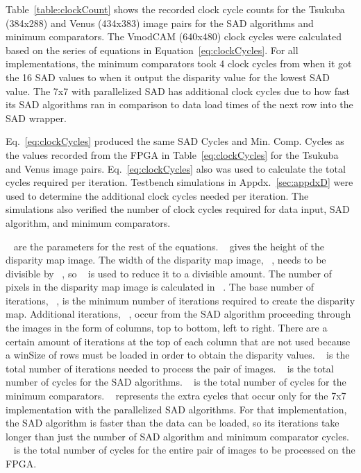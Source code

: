 Table~\ref{table:clockCount} shows the recorded clock cycle counts for the Tsukuba (384x288) and Venus (434x383) image pairs for the SAD algorithms and minimum comparators. The VmodCAM (640x480) clock cycles were calculated based on the series of equations in Equation~\ref{eq:clockCycles}. For all implementations, the minimum comparators took 4 clock cycles from when it got the 16 SAD values to when it output the disparity value for the lowest SAD value. The 7x7 with parallelized SAD has additional clock cycles due to how fast its SAD algorithms ran in comparison to data load times of the next row into the SAD wrapper.

Eq.~\ref{eq:clockCycles} produced the same SAD Cycles and Min. Comp. Cycles as the values recorded from the FPGA in Table~\ref{eq:clockCycles} for the Tsukuba and Venus image pairs. Eq.~\ref{eq:clockCycles} also was used to calculate the total cycles required per iteration. Testbench simulations in Appdx.~\ref{sec:appdxD} were used to determine the additional clock cycles needed per iteration. The simulations also verified the number of clock cycles required for data input, SAD algorithm, and minimum comparators.

~ are the parameters for the rest of the equations. ~ gives the height of the disparity map image. The width of the disparity map image, ~, needs to be divisible by ~, so ~ is used to reduce it to a divisible amount. The number of pixels in the disparity map image is calculated in ~. The base number of iterations, ~, is the minimum number of iterations required to create the disparity map. Additional iterations, ~, occur from the SAD algorithm proceeding through the images in the form of columns, top to bottom, left to right. There are a certain amount of iterations at the top of each column that are not used because a winSize of rows must be loaded in order to obtain the disparity values. ~ is the total number of iterations needed to process the pair of images. ~ is the total number of cycles for the SAD algorithms. ~ is the total number of cycles for the minimum comparators. ~ represents the extra cycles that occur only for the 7x7 implementation with the parallelized SAD algorithms. For that implementation, the SAD algorithm is faster than the data can be loaded, so its iterations take longer than just the number of SAD algorithm and minimum comparator cycles. ~ is the total number of cycles for the entire pair of images to be processed on the FPGA.

